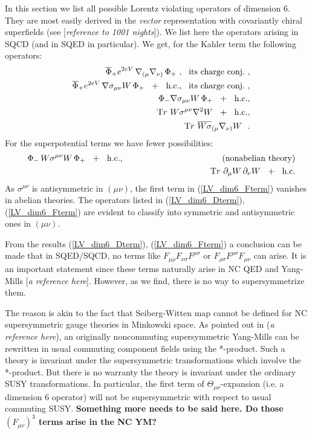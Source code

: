 \documentclass[a4paper,12pt]{article}
\begin{document}
	In this section we list all possible Lorentz violating
        operators of dimension 6. 
        They are most easily derived in the {\it vector} representation
        with covariantly chiral superfields 
	(see [\emph{reference to 1001 nights}]). 
        We list here the operators arising in SQCD (and in SQED in particular).
        We get, for the Kahler term the following operators:
\begin{eqnarray}
\label{LV_dim6_Dterm}
\nonumber
  &&  \overline{\Phi}_+ e^{2eV}\, \nabla_{(\mu} \nabla_{\nu)} \,\Phi_+ 
               ~,~~ {\rm its\ charge\ conj.}~, \\
\nonumber
  &&  \overline{\Phi}_+ e^{2eV}\, \nabla\sigma_{\mu\nu}W \,\Phi_+ 
        ~~+~~  {\rm h.c.},~~ {\rm its\ charge\ conj.}~, \\
  &&  \Phi_- \nabla\sigma_{\mu\nu}W \,\Phi_+
        ~~+~~  {\rm h.c.}, \\
\nonumber
  &&  {\mathrm Tr} ~ W\sigma^{\mu\nu}\nabla^2 W 
        ~~+~~  {\rm h.c.}, \\
\nonumber
  &&  {\mathrm Tr} ~ \overline{W \sigma}_{ (\mu}\nabla_{\nu)} W~~.
\end{eqnarray}
        For the superpotential terms we have fewer possibilities:
\begin{eqnarray}
\label{LV_dim6_Fterm}
\nonumber
      && \Phi_-\, W\sigma^{\mu\nu}W \,\Phi_+ ~~+~~ {\rm h.c.},
        ~~~~~~~~~~~~~~~~~~~~~~~~~~~~~~~~~~~{\rm (nonabelian\ theory)} \\
      && {\mathrm Tr} ~ \partial_\mu W \, \partial_\nu W ~~+~~ 
		 {\rm h.c.}
\end{eqnarray}
        As $ \sigma^{\mu\nu} $ is antisymmetric in $ (\mu\nu) $, 
	the first term in (\ref{LV_dim6_Fterm}) vanishes in 
	abelian theories.
	The operators listed in (\ref{LV_dim6_Dterm}), (\ref{LV_dim6_Fterm})
	are evident to classify into symmetric and antisymmetric
	ones in $ (\mu\nu) $.
	
	From the results (\ref{LV_dim6_Dterm}), 
	(\ref{LV_dim6_Fterm}) a conclusion can be
	made that in SQED/SQCD, no terms like 
  $ F_{\mu\rho}F_{\nu\sigma}F^{\rho\sigma} $
	or
  $ F_{\rho\sigma}F^{\rho\sigma}F_{\mu\nu} $
	can arise.
	It is an important statement since these terms naturally
	arise in NC QED and Yang-Mills [{\it a reference here}].
	However, as we find, there is no way to supersymmetrize them.

	The reason is akin to the fact that Seiberg-Witten map cannot
	be defined for NC supersymmetric gauge theories in Minkowski space.
	As pointed out in ({\it a reference here}), an originally 
	noncommuting supersymmetric Yang-Mills can be rewritten in
	usual commuting component fields using the *-product.
	Such a theory is invariant under the supersymmetric transformations
	which involve the *-product.
	But there is no warranty the theory is invariant under the
	ordinary SUSY transformations.
	In particular, the first term of $ \Theta_{\mu\nu} $-expansion 
	(i.e. a dimension 6 operator) will not be supersymmetric
	with respect to usual commuting SUSY.
	{\bf Something more needs to be said here. Do those 
	  $ (F_{\mu\nu})^3 $ terms arise in the NC YM?}
\end{document}
